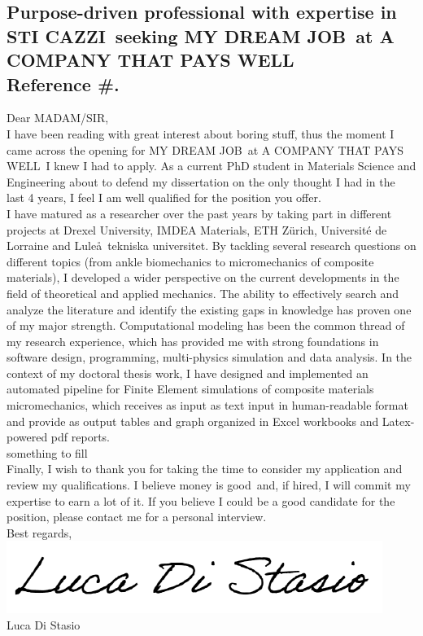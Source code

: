 \documentclass[
  a4paper, 
]{fortysecondscv}
\def\expertise{STI CAZZI}
\def\position{MY DREAM JOB}
\def\company{A COMPANY THAT PAYS WELL}
\def\reference{\\[6pt] Reference \#}
\def\salutation{MADAM/SIR}
\def\readinginterest{boring stuff}
\def\dissertationtopic{the only thought I had in the last 4 years}
\def\finalbelief{money is good}
\def\finalcommitment{earn a lot of it}
\begin{document}
\makefrontsidebar

\cvsignature
\vspace*{12pt}
\subsection{\textbf{Purpose-driven professional with expertise in \expertise\ seeking \position\ at \company\reference.}}
\vspace*{12pt}
Dear \salutation,\\[6pt]
I have been reading with great interest about \readinginterest, thus the moment I came across the opening for \position\ at \company\ I knew I had to apply. As a current PhD student in Materials Science and Engineering about to defend my dissertation on \dissertationtopic, I feel I am well qualified for the position you offer.\\[6pt]
I have matured as a researcher over the past years by taking part in different projects at Drexel University, IMDEA Materials, ETH Z\"urich, Universit\'e de Lorraine and Lule\aa\ tekniska universitet. By tackling several research questions on different topics (from ankle biomechanics to micromechanics of composite materials), I developed a wider perspective on the current developments in the field of theoretical and applied mechanics. The ability to effectively search and analyze the literature and identify the existing gaps in knowledge has proven one of my major strength. Computational modeling has been the common thread of my research experience, which has provided me with strong foundations in software design, programming, multi-physics simulation and data analysis. In the context of my doctoral thesis work, I have designed and implemented an automated pipeline for Finite Element simulations of composite materials micromechanics, which receives as input as text input in human-readable format and provide as output tables and graph organized in Excel workbooks and Latex-powered pdf reports.\\[6pt]
\lipsum[3]something to fill\\[6pt]
Finally, I wish to thank you for taking the time to consider my application and review my qualifications. I believe \finalbelief\ and, if hired, I will commit my expertise to \finalcommitment. If you believe I could be a good candidate for the position, please contact me for a personal interview.\\[12pt]
Best regards,\\
\includegraphics[scale=0.75]{Signature.png}\\
Luca Di Stasio
\end{document}
